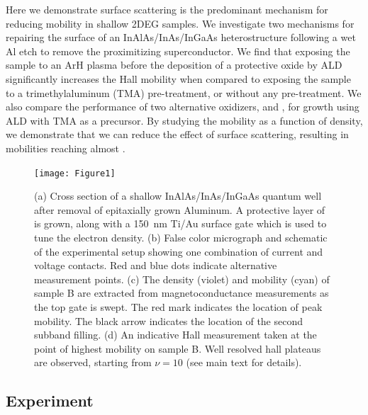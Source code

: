 Here we demonstrate surface scattering is the predominant mechanism for reducing mobility in shallow 2DEG samples. We investigate two mechanisms for repairing the surface of an  InAlAs/InAs/InGaAs heterostructure following a wet Al etch to remove the proximitizing superconductor. We find that exposing the sample to an ArH plasma before the deposition of a protective  oxide by ALD significantly increases the Hall mobility when compared to exposing the sample to a trimethylaluminum (TMA) pre-treatment, or without any pre-treatment. We also compare the performance of two alternative oxidizers,  and , for  growth using ALD with TMA as a precursor. By studying the mobility as a function of density, we demonstrate that we can reduce the effect of surface scattering, resulting in mobilities reaching almost .
\begin{figure}
\texttt{[image: Figure1]}
\caption{\label{fig:surf_fig1} (a) Cross section of a shallow InAlAs/InAs/InGaAs quantum well after removal of epitaxially grown Aluminum. A protective layer of  is grown, along with a \SI{150}{\nano\meter} Ti/Au surface gate which is used to tune the electron density. (b) False color micrograph and schematic of the experimental setup showing one combination of current and voltage contacts. Red and blue dots indicate alternative measurement points. (c) The density (violet) and mobility (cyan) of sample B are extracted from magnetoconductance measurements as the top gate is swept. The red mark indicates the location of peak mobility. The black arrow indicates the location of the second subband filling. (d) An indicative Hall measurement taken at the point of highest mobility on sample B. Well resolved hall plateaus are observed, starting from $\nu = 10$ (see main text for details).}
\end{figure}

\subsection{\label{sec:surf_exp}Experiment}

